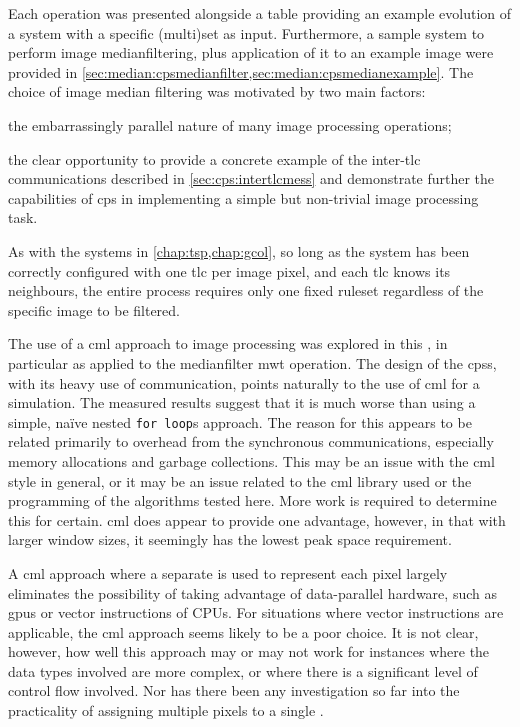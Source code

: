 Each operation was presented alongside a table providing an example evolution of a system with a specific (multi)set as input.  Furthermore, a sample system to perform image \gls{medianfilter}ing, plus application of it to an example image were provided in \cref{sec:median:cpsmedianfilter,sec:median:cpsmedianexample}.  The choice of image median filtering was motivated by two main factors:
\begin{inparaenum}[(i)]
\item the embarrassingly parallel nature of many image processing operations;
\item the clear opportunity to provide a concrete example of the inter-\gls{tlc} communications described in \cref{sec:cps:intertlcmess} and demonstrate further the capabilities of \gls{cps} in implementing a simple but non-trivial image processing task.
\end{inparaenum}
As with the systems in \cref{chap:tsp,chap:gcol}, so long as the system has been correctly configured with one \gls{tlc} per image pixel, and each \gls{tlc} knows its neighbours, the entire process requires only one fixed ruleset regardless of the specific image to be filtered.

The use of a \gls{cml} approach to image processing was explored in this , in particular as applied to the \gls{medianfilter} \gls{mwt} operation.  The design of the \glspl{cps}, with its heavy use of communication, points naturally to the use of \gls{cml} for a simulation.  The measured results suggest that it is much worse than using a simple, naïve nested \texttt{for loop}s approach.  The reason for this appears to be related primarily to overhead from the synchronous communications, especially memory allocations and garbage collections.  This may be an issue with the \gls{cml} style in general, or it may be an issue related to the \gls{cml} library used or the programming of the algorithms tested here.  More work is required to determine this for certain.  \Gls{cml} does appear to provide one advantage, however, in that with larger window sizes, it seemingly has the lowest peak space requirement.

A \gls{cml} approach where a separate  is used to represent each pixel largely eliminates the possibility of taking advantage of data-parallel hardware, such as \glspl{gpu} or vector instructions of CPUs.  For situations where vector instructions are applicable, the \gls{cml} approach seems likely to be a poor choice.  It is not clear, however, how well this approach may or may not work for instances where the data types involved are more complex, or where there is a significant level of control flow involved.  Nor has there been any investigation so far into the practicality of assigning multiple pixels to a single .